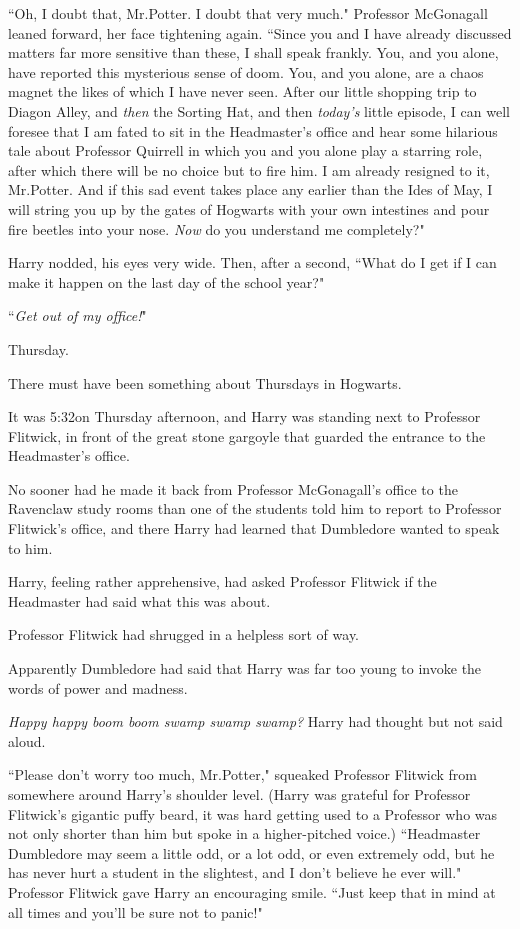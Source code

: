 ``Oh, I doubt that, Mr.\?Potter. I doubt that very much." Professor McGonagall leaned forward, her face tightening again. ``Since you and I have already discussed matters far more sensitive than these, I shall speak frankly. You, and you alone, have reported this mysterious sense of doom. You, and you alone, are a chaos magnet the likes of which I have never seen. After our little shopping trip to Diagon Alley, and \emph{then} the Sorting Hat, and then \emph{today's} little episode, I can well foresee that I am fated to sit in the Headmaster's office and hear some hilarious tale about Professor Quirrell in which you and you alone play a starring role, after which there will be no choice but to fire him. I am already resigned to it, Mr.\?Potter. And if this sad event takes place any earlier than the Ides of May, I will string you up by the gates of Hogwarts with your own intestines and pour fire beetles into your nose. \emph{Now} do you understand me completely?"

Harry nodded, his eyes very wide. Then, after a second, ``What do I get if I can make it happen on the last day of the school year?"

``\emph{Get out of my office!}"

\later

Thursday.

There must have been something about Thursdays in Hogwarts.

It was 5:32\pm on Thursday afternoon, and Harry was standing next to Professor Flitwick, in front of the great stone gargoyle that guarded the entrance to the Headmaster's office.

No sooner had he made it back from Professor McGonagall's office to the Ravenclaw study rooms than one of the students told him to report to Professor Flitwick's office, and there Harry had learned that Dumbledore wanted to speak to him.

Harry, feeling rather apprehensive, had asked Professor Flitwick if the Headmaster had said what this was about.

Professor Flitwick had shrugged in a helpless sort of way.

Apparently Dumbledore had said that Harry was far too young to invoke the words of power and madness.

\emph{Happy happy boom boom swamp swamp swamp?} Harry had thought but not said aloud.

``Please don't worry too much, Mr.\?Potter," squeaked Professor Flitwick from somewhere around Harry's shoulder level. (Harry was grateful for Professor Flitwick's gigantic puffy beard, it was hard getting used to a Professor who was not only shorter than him but spoke in a higher-pitched voice.) ``Headmaster Dumbledore may seem a little odd, or a lot odd, or even extremely odd, but he has never hurt a student in the slightest, and I don't believe he ever will." Professor Flitwick gave Harry an encouraging smile. ``Just keep that in mind at all times and you'll be sure not to panic!"


